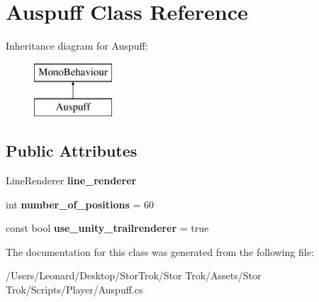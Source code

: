 \hypertarget{class_auspuff}{}\section{Auspuff Class Reference}
\label{class_auspuff}
Inheritance diagram for Auspuff\+:\begin{figure}[H]
\begin{center}
\leavevmode
\includegraphics[height=2.000000cm]{class_auspuff}
\end{center}
\end{figure}
\subsection*{Public Attributes}
\begin{DoxyCompactItemize}
\item 
\mbox{\label{class_auspuff_a638bf5bf159a0aae732a9873180a7a6c}} 
Line\+Renderer {\bfseries line\+\_\+renderer}
\item 
\mbox{\label{class_auspuff_a304d521eeb66988f3a41094b498368ab}} 
int {\bfseries number\+\_\+of\+\_\+positions} = 60
\item 
\mbox{\label{class_auspuff_a46a8ef5df8bcf1d97849bb0c0c647923}} 
const bool {\bfseries use\+\_\+unity\+\_\+trailrenderer} = true
\end{DoxyCompactItemize}


The documentation for this class was generated from the following file\+:\begin{DoxyCompactItemize}
\item 
/\+Users/\+Leonard/\+Desktop/\+Stor\+Trok/\+Stor Trok/\+Assets/\+Stor Trok/\+Scripts/\+Player/Auspuff.\+cs\end{DoxyCompactItemize}
